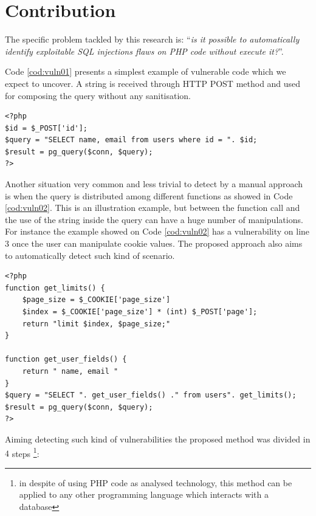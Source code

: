 \section{Contribution}\label{sec:cont}
The specific problem tackled by this research is: ``\textit{is it possible to automatically identify exploitable SQL injections flaws on PHP code without execute it?}''. 

Code \ref{cod:vuln01} presents a simplest example of vulnerable code which we expect to uncover. A string is received through HTTP POST method and used for composing the query without any sanitisation. 

\begin{lstlisting}[caption=Example of simplest vulnerable code,label=cod:vuln01]
<?php
$id = $_POST['id'];
$query = "SELECT name, email from users where id = ". $id;
$result = pg_query($conn, $query);
?>
\end{lstlisting}

Another situation very common and less trivial to detect by a manual approach is when the query is distributed among different functions as showed in Code \ref{cod:vuln02}. This is an illustration example, but between the function call and the use of the string inside the query can have a huge number of manipulations. For instance the example showed on Code \ref{cod:vuln02} has a vulnerability on line $3$ once the user can manipulate cookie values. The proposed approach also aims to automatically detect such kind of scenario.

\begin{lstlisting}[caption=Example of vulnerable code with multiple functions,label=cod:vuln02]
<?php
function get_limits() {
	$page_size = $_COOKIE['page_size']
	$index = $_COOKIE['page_size'] * (int) $_POST['page'];
	return "limit $index, $page_size;"  
}

function get_user_fields() {
	return " name, email "
}
$query = "SELECT ". get_user_fields() ." from users". get_limits();
$result = pg_query($conn, $query);
?>
\end{lstlisting}

Aiming detecting such kind of vulnerabilities the proposed method was divided in $4$ steps \footnote{in despite of using PHP code as analysed technology, this method can be applied to any other programming language which interacts with a database}:

